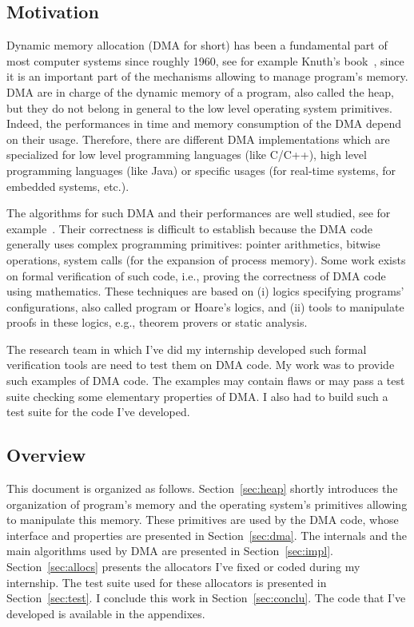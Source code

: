 \subsection{Motivation}

Dynamic memory allocation (DMA for short) has been a fundamental part of most computer systems since roughly 1960,
see for example Knuth's book~\cite{Knuth73a},
since it is an important part of the mechanisms allowing to manage program's memory.
DMA are in charge of the dynamic memory of a program, also called the heap, but they do not belong in general to the low level operating system primitives. Indeed, the performances in time and memory consumption of the DMA depend on their usage.
Therefore, there are different DMA implementations which are specialized for low level programming languages (like C/C++), high level programming languages (like Java) or specific usages (for real-time systems, for embedded systems, etc.).

The algorithms for such DMA and their performances are well studied, see for example~\cite{Knuth73a,WilsonJNB95}.
Their correctness is difficult to establish because the DMA code generally uses complex programming primitives: pointer arithmetics, bitwise operations, system calls (for the expansion of process memory). 
Some work exists on formal verification of such code, i.e., proving the correctness of DMA code using mathematics. These techniques are based on (i) logics specifying programs' configurations, also called program or Hoare's logics,
and (ii) tools to manipulate proofs in these logics, e.g., theorem provers or static analysis.

The research team in which I've did my internship developed such formal verification tools are need to test them on DMA code. My work was to provide such examples of DMA code. The examples may contain flaws or may pass a test suite checking some elementary properties of DMA. I also had to build such a test suite for the code I've developed.

\subsection{Overview}

This document is organized as follows.
Section~\ref{sec:heap} shortly introduces the organization of program's memory and the operating system's primitives allowing to manipulate this memory.
These primitives are used by the DMA code, whose interface and properties are presented in Section~\ref{sec:dma}.
The internals and the main algorithms used by DMA are presented in Section~\ref{sec:impl}.
Section~\ref{sec:allocs} presents the allocators I've fixed or coded during my internship.
The test suite used for these allocators is presented in Section~\ref{sec:test}.
I conclude this work in Section~\ref{sec:conclu}.
The code that I've developed is available in the appendixes.
